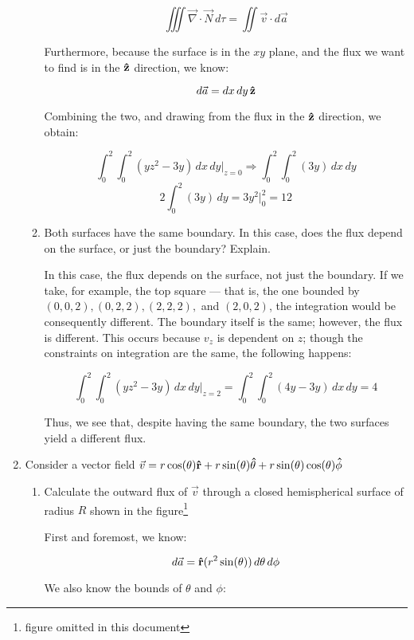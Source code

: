 \begin{enumerate}
\begin{enumerate}
        $$\iiint \vec{\nabla}\cdot\vec{N}\,d\tau=\iint\vec{v}\cdot d\vec{a}$$

        Furthermore, because the surface is in the $xy$ plane, and the flux we want to find is in the $\bold{\hat{z}}$ direction, we know:

        $$d\vec{a}=dx\,dy\,\bold{\hat{z}}$$

        Combining the two, and drawing from the flux in the $\bold{\hat{z}}$ direction, we obtain:

        $$\int_0^2\int_0^2 (yz^2-3y)\,dx\,dy\Big|_{z=0}\Rightarrow\int_0^2\int_0^2 (3y)\,dx\,dy$$
        $$\boxed{2\int_0^2 (3y)\,dy=3y^2\Big|_0^2=12}$$

      \item Both surfaces have the same boundary. In this case, does the flux depend on the surface, or just the boundary? Explain.

        In this case, the flux depends on the surface, not just the boundary. If we take, for example, the top square — that is, the one bounded by $(0, 0, 2), (0, 2, 2), (2, 2, 2),$ and $(2, 0, 2)$, the integration would be consequently different. The boundary itself is the same; however, the flux is different. This occurs because $v_z$ is dependent on $z$; though the constraints on integration are the same, the following happens:

        $$\int_0^2\int_0^2(yz^2-3y)\,dx\,dy\Big|_{z=2}=\int_0^2\int_0^2(4y-3y)\,dx\,dy=4$$

        Thus, we see that, despite having the same boundary, the two surfaces yield a different flux.

    \end{enumerate}

  \item Consider a vector field $\vec{v}=r\cos(\theta)\bold{\hat{r}}+r\sin(\theta)\bold{\hat{\theta}}+r\sin(\theta)\cos(\theta)\bold{\hat{\phi}}$

    \begin{enumerate}

      \item Calculate the outward flux of $\vec{v}$ through a closed hemispherical surface of radius $R$ shown in the figure\footnote{figure omitted in this document}

        First and foremost, we know:

        $$d\vec{a}=\bold{\hat{r}}(r^2\sin(\theta))\,d\theta\,d\phi$$

        We also know the bounds of $\theta$ and $\phi$:


\end{enumerate}
\end{enumerate}
